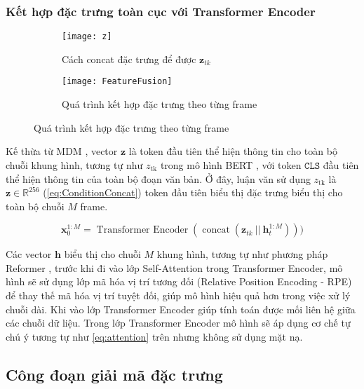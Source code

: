 \subsubsection{Kết hợp đặc trưng toàn cục với Transformer Encoder}

\begin{figure}[H]
	\centering
	\begin{subfigure}{0.42\textwidth}
		\centering
		\texttt{[image: z]}
		\caption{Cách concat đặc trưng để được $\mathbf{z}_{tk}$}
		\label{fig:FeatureFusion}
	\end{subfigure}
	\hfill
	\begin{subfigure}{0.55\textwidth}
		\centering
		\texttt{[image: FeatureFusion]}
		\caption{Quá trình kết hợp đặc trưng theo từng frame}
		\label{fig:ZToken}
	\end{subfigure}
\end{figure}



Kế thừa từ MDM \cite{tevet2022human}, vector $\mathbf{z}$ là token đầu tiên thể hiện thông tin cho toàn bộ chuỗi khung hình, tương tự như  $z_{\text{tk}}$ trong mô hình BERT \cite{devlin2019bertpretrainingdeepbidirectional}, với token $\texttt{CLS}$ đầu tiên thể hiện thông tin của toàn bộ đoạn văn bản.
Ở đây, luận văn sử dụng $z_{\text{tk}}$ là $\mathbf{z} \in \mathbb{R}^{256}$ (\autoref{eq:ConditionConcat}) token đầu tiên biểu thị đặc trưng biểu thị cho toàn bộ chuỗi $M$ frame.

\begin{equation}
	\mathbf{x}^{1:M}_{0}  = \operatorname{Transformer\ Encoder}( \operatorname{concat}( \mathbf{z}_{tk} \ ||\  \mathbf{h}^{1:M}_{t}  )))
	\label{eq:TransformerEncoder}
\end{equation}


Các vector $\mathbf{h}$ biểu thị cho chuỗi $M$ khung hình, tương tự như phương pháp Reformer \cite{kitaev2020reformer}, trước khi đi vào lớp Self-Attention trong Transformer Encoder, mô hình sẽ sử dụng lớp mã hóa vị trí tương đối (Relative Position Encoding - RPE) để thay thế mã hóa vị trí tuyệt đối, giúp mô hình hiệu quả hơn trong việc xử lý chuỗi dài.
Khi vào lớp Transformer Encoder \cite{vaswani2017attention} giúp tính toán được mối liên hệ giữa các chuỗi dữ liệu. 
Trong lớp Transformer Encoder mô hình sẽ áp dụng cơ chế tự chú ý tương tự như \autoref{eq:attention} trên nhưng không sử dụng mặt nạ. 


\subsection{Công đoạn giải mã đặc trưng}

